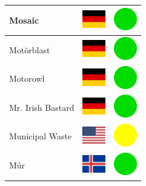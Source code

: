 \documentclass[12pt, a4paper, twoside]{report}
\begin{document}
\begin{center}
\begin{longtable}{|p{5cm}|p{2cm}|p{2cm}|}
			Mosaic & \includegraphics[width=1cm]{4x3/de} & \includegraphics[width=1cm]{likes/y} \\ \hline
			Motörblast & \includegraphics[width=1cm]{4x3/de} & \includegraphics[width=1cm]{likes/y} \\ \hline
			Motorowl & \includegraphics[width=1cm]{4x3/de} & \includegraphics[width=1cm]{likes/y} \\ \hline
			Mr. Irish Bastard & \includegraphics[width=1cm]{4x3/de} & \includegraphics[width=1cm]{likes/y} \\ \hline
			Municipal Waste & \includegraphics[width=1cm]{4x3/us} & \includegraphics[width=1cm]{likes/m} \\ \hline
			Múr & \includegraphics[width=1cm]{4x3/is} & \includegraphics[width=1cm]{likes/y} \\ \hline

\end{longtable}
\end{center}
\end{document}
